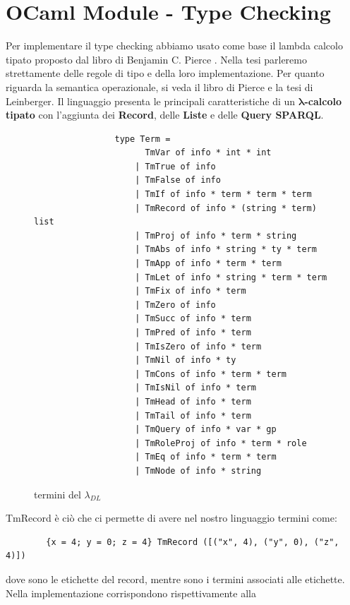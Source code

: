 \section{OCaml Module - Type Checking}\label{sec:Type Checking}
        Per implementare il type checking abbiamo usato come base il lambda calcolo tipato proposto dal libro di Benjamin C. Pierce \cite{pierceTypesBook}.
        Nella tesi parleremo strettamente delle regole di tipo e della loro implementazione. Per quanto riguarda la semantica operazionale, si veda il libro di Pierce e la tesi di Leinberger\cite{leinbergerphdthesis}.
        Il linguaggio presenta le principali caratteristiche di un \textbf{ $\boldsymbol{\lambda}$-calcolo tipato} con l'aggiunta dei \textbf{Record}, delle \textbf{Liste} e delle \textbf{Query SPARQL}.
        \begin{figure}[h] 
            \begin{verbatim}
                type Term =
                      TmVar of info * int * int 
                    | TmTrue of info 
                    | TmFalse of info 
                    | TmIf of info * term * term * term 
                    | TmRecord of info * (string * term) list 
                    | TmProj of info * term * string 
                    | TmAbs of info * string * ty * term 
                    | TmApp of info * term * term 
                    | TmLet of info * string * term * term 
                    | TmFix of info * term 
                    | TmZero of info 
                    | TmSucc of info * term 
                    | TmPred of info * term 
                    | TmIsZero of info * term 
                    | TmNil of info * ty 
                    | TmCons of info * term * term 
                    | TmIsNil of info * term 
                    | TmHead of info * term 
                    | TmTail of info * term  
                    | TmQuery of info * var * gp
                    | TmRoleProj of info * term * role
                    | TmEq of info * term * term
                    | TmNode of info * string
            \end{verbatim}
        \caption{termini del $\lambda_{DL}$}
        \end{figure}
        TmRecord è ciò che ci permette di avere nel nostro linguaggio termini come:
        \begin{verbatim}
        {x = 4; y = 0; z = 4} TmRecord ([("x", 4), ("y", 0), ("z", 4)])
        \end{verbatim}
        dove  sono le etichette del record, mentre  sono i termini associati alle etichette. Nella implementazione corrispondono rispettivamente alla

